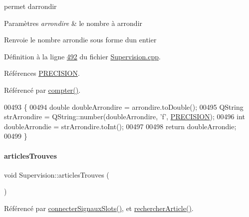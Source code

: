 permet d\textquotesingle{}arrondir 
\begin{DoxyParams}{Paramètres}
{\em arrondire} & le nombre à arrondir \\
\hline
\end{DoxyParams}
\begin{DoxyReturn}{Renvoie}
le nombre arrondie sous forme d\textquotesingle{}un entier 
\end{DoxyReturn}


Définition à la ligne \hyperlink{_supervision_8cpp_source_l00492}{492} du fichier \hyperlink{_supervision_8cpp_source}{Supervision.\+cpp}.



Références \hyperlink{_supervision_8h_source_l00026}{P\+R\+E\+C\+I\+S\+I\+ON}.



Référencé par \hyperlink{_supervision_8cpp_source_l00452}{compter()}.


\begin{DoxyCode}
00493 \{
00494     \textcolor{keywordtype}{double} doubleArrondire = arrondire.toDouble();
00495     QString strArrondire = QString::number(doubleArrondire, \textcolor{charliteral}{'f'}, \hyperlink{_supervision_8h_a9c7b069fee3c8184e14a7de8e5da2dc6}{PRECISION});
00496     \textcolor{keywordtype}{int} doubleArrondie = strArrondire.toInt();
00497 
00498     \textcolor{keywordflow}{return} doubleArrondie;
00499 \}
\end{DoxyCode}
\mbox{\label{class_supervision_a3023468d106abfe7dc697e61a63778ed}} 
\paragraph{\texorpdfstring{articles\+Trouves}{articlesTrouves}}
{\footnotesize\ttfamily void Supervision\+::articles\+Trouves (\begin{DoxyParamCaption}\item[{Q\+Vector$<$ Q\+String\+List $>$}]{ }\end{DoxyParamCaption})\hspace{0.3cm}{\ttfamily [signal]}}



Référencé par \hyperlink{_supervision_8cpp_source_l00273}{connecter\+Signaux\+Slots()}, et \hyperlink{_supervision_8cpp_source_l00305}{rechercher\+Article()}.


